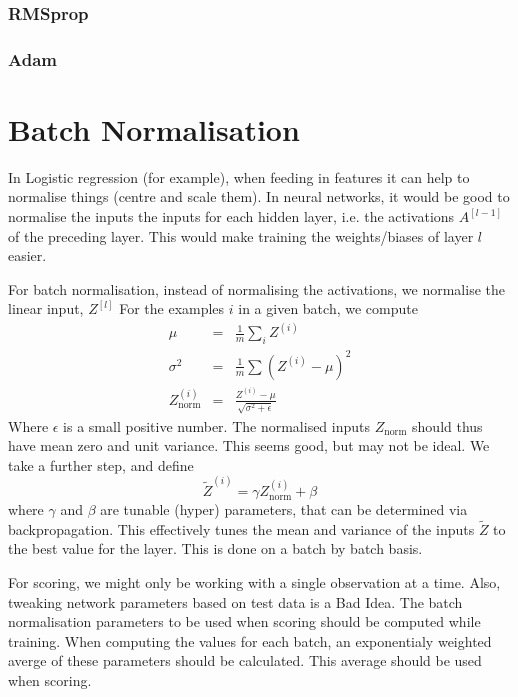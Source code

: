 \documentclass{article}
\begin{document}
\subsubsection{RMSprop}

\subsubsection{Adam}

\section{Batch Normalisation}
In Logistic regression (for example), when feeding in features it can help to normalise things (centre and scale them). 
In neural networks, it would be good to normalise the inputs the inputs for each hidden layer, i.e. the activations $A^{[l-1]}$ of the preceding layer. This would make training the weights/biases of layer $l$ easier.

For batch normalisation, instead of normalising the activations, we normalise the linear input, $Z^{[l]}$
For the examples $i$ in a given batch, we compute
\begin{eqnarray}
\mu &=& \frac{1}{m} \sum_i Z^{(i)} \\
\sigma^2 &=& \frac{1}{m} \sum (Z^(i) - \mu)^2 \\
Z^{(i)}_\mathrm{norm} & = & \frac{Z^{(i)} - \mu}{\sqrt{\sigma^2 + \epsilon}}
\end{eqnarray}
Where $\epsilon$ is a small positive number. The normalised inputs $Z_\mathrm{norm}$ should thus have mean zero and unit variance. This seems good, but may not be ideal. We take a further step, and define
\begin{equation}
\tilde{Z}^{(i)} = \gamma Z^{(i)}_\mathrm{norm} + \beta
\end{equation}
where $\gamma$ and $\beta$ are tunable (hyper) parameters, that can be determined via backpropagation. This effectively tunes the mean and variance of the inputs $\tilde{Z}$ to the best value for the layer. This is done on a batch by batch basis.

For scoring, we might only be working with a single observation at a time. Also, tweaking network parameters based on test data is a Bad Idea. The batch normalisation parameters to be used when scoring should be computed while training. When computing the values for each batch, an exponentialy weighted averge of these parameters should be calculated. This average should be used when scoring.
\end{document}
